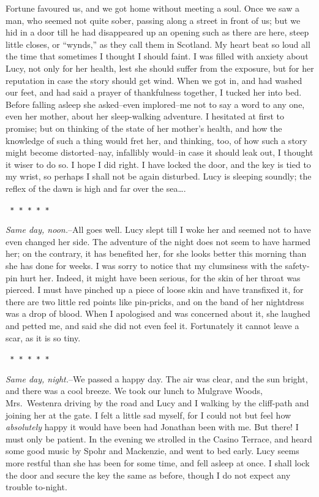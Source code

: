\documentclass[12pt,openright]{book}
\begin{document}
Fortune favoured us, and we got home without meeting a soul. Once we saw a man, who seemed not quite sober, passing along a street in front of us; but we hid in a door till he had disappeared up an opening such as there are here, steep little closes, or “wynds,” as they call them in Scotland. My heart beat so loud all the time that sometimes I thought I should faint. I was filled with anxiety about Lucy, not only for her health, lest she should suffer from the exposure, but for her reputation in case the story should get wind. When we got in, and had washed our feet, and had said a prayer of thankfulness together, I tucked her into bed. Before falling asleep she asked–even implored–me not to say a word to any one, even her mother, about her sleep-walking adventure. I hesitated at first to promise; but on thinking of the state of her mother’s health, and how the knowledge of such a thing would fret her, and thinking, too, of how such a story might become distorted–nay, infallibly would–in case it should leak out, I thought it wiser to do so. I hope I did right. I have locked the door, and the key is tied to my wrist, so perhaps I shall not be again disturbed. Lucy is sleeping soundly; the reflex of the dawn is high and far over the sea….

\texttt{   *       *       *       *       *}

\textit{Same day, noon.}–All goes well. Lucy slept till I woke her and seemed not to have even changed her side. The adventure of the night does not seem to have harmed her; on the contrary, it has benefited her, for she looks better this morning than she has done for weeks. I was sorry to notice that my clumsiness with the safety-pin hurt her. Indeed, it might have been serious, for the skin of her throat was pierced. I must have pinched up a piece of loose skin and have transfixed it, for there are two little red points like pin-pricks, and on the band of her nightdress was a drop of blood. When I apologised and was concerned about it, she laughed and petted me, and said she did not even feel it. Fortunately it cannot leave a scar, as it is so tiny.

\texttt{   *       *       *       *       *}

\textit{Same day, night.}–We passed a happy day. The air was clear, and the sun bright, and there was a cool breeze. We took our lunch to Mulgrave Woods, Mrs. Westenra driving by the road and Lucy and I walking by the cliff-path and joining her at the gate. I felt a little sad myself, for I could not but feel how \textit{absolutely} happy it would have been had Jonathan been with me. But there! I must only be patient. In the evening we strolled in the Casino Terrace, and heard some good music by Spohr and Mackenzie, and went to bed early. Lucy seems more restful than she has been for some time, and fell asleep at once. I shall lock the door and secure the key the same as before, though I do not expect any trouble to-night.
\end{document}
